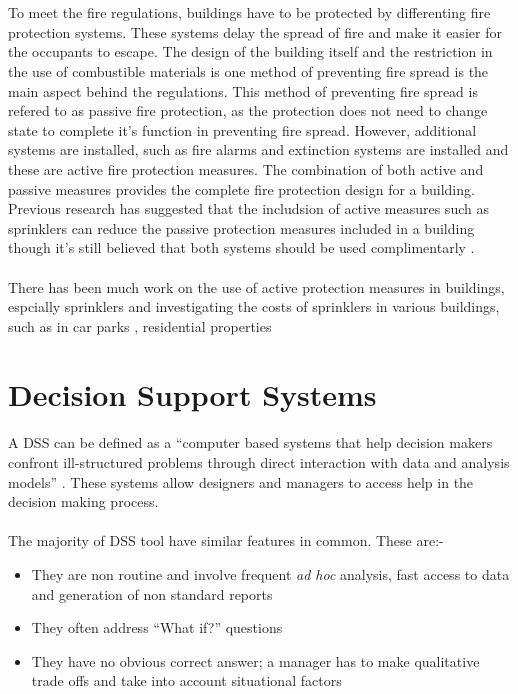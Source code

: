 \documentclass[table,a4paper,oneside]{book}
\begin{document}
\\
\\
To meet the fire regulations, buildings have to be protected by differenting fire protection systems. These systems delay the spread of fire and make it easier for the occupants to escape. The design of the building itself and the restriction in the use of combustible materials is one method of preventing fire spread is the main aspect behind the regulations. This method of preventing fire spread is refered to as passive fire protection, as the protection does not need to change state to complete it's function in preventing fire spread. However, additional systems are installed, such as fire alarms and extinction systems are installed and these are active fire protection measures. The combination of both active and passive measures provides the complete fire protection design for a building. Previous research has suggested that the includsion of active measures such as sprinklers can reduce the passive protection measures included in a building \citep{Baldwin1974} though it's still believed that both systems should be used complimentarly \citep{Haack2004}.
\\
\\
There has been much work on the use of active protection measures in buildings, espcially sprinklers \citep{Hall2010,Melinek1993299,Vaidogas2011,Melinek1993} and investigating the costs of sprinklers in various buildings, such as in car parks \citep{Li2004}, residential properties \citep{Butry2009}

\section{Decision Support Systems}
\label{sec:DSS}
A \ac{DSS} can be defined as a ``computer based systems that help decision makers confront ill-structured problems through direct interaction with data and analysis models'' \citep{SpragueWatson198906}. These systems allow designers and managers to access help in the decision making process.
\\
\\
The majority of \ac{DSS} tool have similar features in common. These are:-
\begin{itemize}
\item They are non routine and involve frequent \emph{ad hoc} analysis, fast access to data and generation of non standard reports
\item They often address ``What if?'' questions
\item They have no obvious correct answer; a manager has to make qualitative trade offs and take into account situational factors
\end{itemize}
\end{document}
